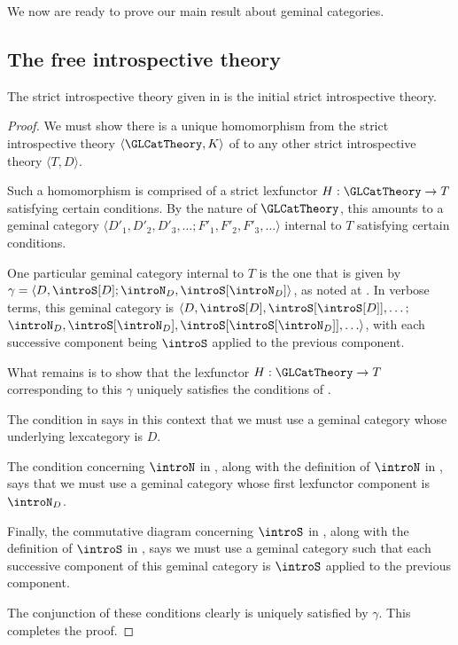 We now are ready to prove our main result about geminal categories.

\subsection{The free introspective theory}
\begin{theorem}\label{InitialIntrospectiveTheory}
The strict introspective theory given in  is the initial strict introspective theory.
\end{theorem}
\begin{proof}
We must show there is a unique homomorphism from the strict introspective theory $\langle \GLCatTheory, K \rangle$ of  to any other strict introspective theory $\langle T, D \rangle$.

Such a homomorphism is comprised of a strict lexfunctor $H : \GLCatTheory \to T$ satisfying certain conditions. By the nature of $\GLCatTheory$, this amounts to a geminal category $\langle D'_1, D'_2, D'_3, \ldots; F'_1, F'_2, F'_3, \ldots \rangle$ internal to $T$ satisfying certain conditions.

One particular geminal category internal to $T$ is the one that is given by $\gamma = \langle D, \introS[D]; \introN_D, \introS[\introN_D] \rangle$, as noted at . In verbose terms, this geminal category is $\langle D, \introS[D], \introS[\introS[D]], \ldots;$ $ \introN_D, \introS[\introN_D], \introS[\introS[\introN_D]], \ldots \rangle$, with each successive component being $\introS$ applied to the previous component.

What remains is to show that the lexfunctor $H : \GLCatTheory \to T$ corresponding to this $\gamma$ uniquely satisfies the conditions of .

The condition  in  says in this context that we must use a geminal category whose underlying lexcategory is $D$.

The condition concerning $\introN$ in , along with the definition of $\introN$ in , says that we must use a geminal category whose first lexfunctor component is $\introN_{D}$.

Finally, the commutative diagram concerning $\introS$ in , along with the definition of $\introS$ in , says we must use a geminal category such that each successive component of this geminal category is $\introS$ applied to the previous component.

The conjunction of these conditions clearly is uniquely satisfied by $\gamma$. This completes the proof.
\end{proof}

